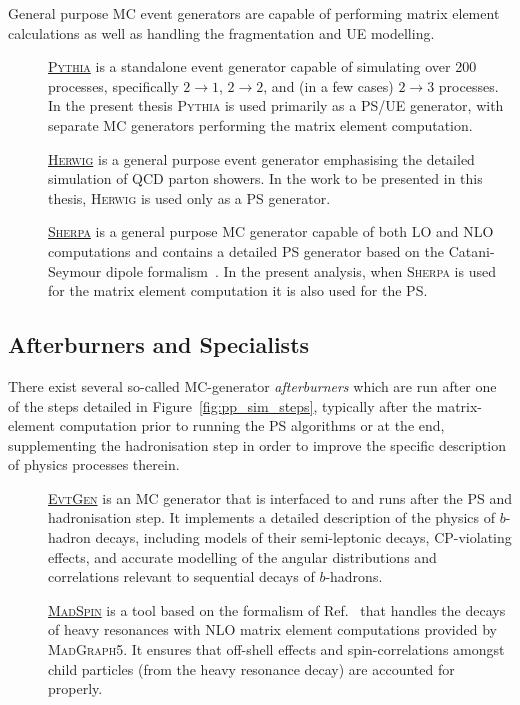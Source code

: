 General purpose MC event generators are capable of performing matrix element calculations
as well as handling the fragmentation and UE modelling.

\begin{description}
    \item[] \underline{\textsc{Pythia}} \cite{PYTHIA8Intro,PYTHIA8} is a standalone event generator
        capable of simulating over 200 processes, specifically $2\rightarrow 1$, $2 \rightarrow 2$, and
        (in a few cases) $2\rightarrow3$ processes.
        In the present thesis \textsc{Pythia} is used primarily as a PS/UE generator, with separate MC generators
        performing the matrix element computation.
    \item[] \underline{\textsc{Herwig}} \cite{HERWIG6,HERWIG7} is a general purpose event generator emphasising
        the detailed simulation of QCD parton showers. In the work to be presented in this thesis,
        \textsc{Herwig} is used only as a PS generator.
    \item[] \underline{\textsc{Sherpa}} \cite{SHERPA1,SHERPA2} is a general purpose MC generator capable
        of both LO and NLO computations and contains a detailed PS generator based on the
        Catani-Seymour dipole formalism~\cite{Schumann:2007mg}.
        In the present analysis, when \textsc{Sherpa} is used for the matrix element computation it is
        also used for the PS.
\end{description}

\subsection{Afterburners and Specialists}
\label{sec:mc_gen_afterburner}

There exist several so-called MC-generator \textit{afterburners} which are run
after one of the steps detailed in Figure~\ref{fig:pp_sim_steps}, typically after the matrix-element
computation prior to running the PS algorithms or at the end, supplementing the hadronisation step in order
to improve the specific description of physics processes therein.

\begin{description}
    \item[] \underline{\textsc{EvtGen}} \cite{EVTGEN} is an MC generator that is interfaced to and runs after
        the PS and hadronisation step. It implements a detailed description of the physics of $b$-hadron
        decays, including models of their semi-leptonic decays, CP-violating effects, and accurate
        modelling of the angular distributions and correlations relevant to sequential decays of $b$-hadrons.
    \item[] \underline{\textsc{MadSpin}} \cite{MADSPIN1} is a tool based on the formalism of Ref.~\cite{MADSPIN2}
        that handles the decays of heavy resonances with NLO matrix element computations provided by \textsc{MadGraph5}.
        It ensures that
        off-shell effects and spin-correlations amongst child particles (from the heavy resonance decay) are accounted for properly.
\end{description}


